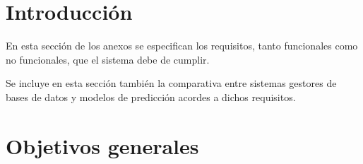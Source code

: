 
\section{Introducción}



En esta sección de los anexos se especifican los requisitos, tanto funcionales como no funcionales, que el sistema 
debe de cumplir.

Se incluye en esta sección también la comparativa entre sistemas gestores de bases de datos y modelos de predicción 
acordes a dichos requisitos.

\section{Objetivos generales}


